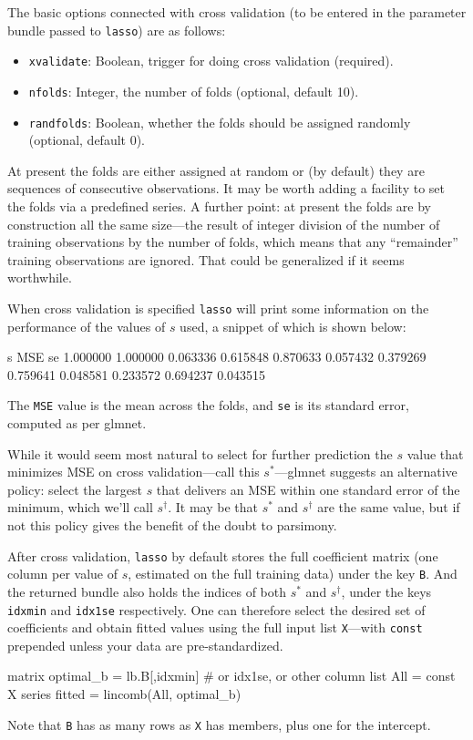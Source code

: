 \documentclass{article}
\begin{document}
The basic options connected with cross validation (to be entered in
the parameter bundle passed to \texttt{lasso}) are as follows:
\begin{itemize}
\item \texttt{xvalidate}: Boolean, trigger for doing cross validation (required).
\item \texttt{nfolds}: Integer, the number of folds (optional, default
  10).
\item \texttt{randfolds}: Boolean, whether the folds should be
  assigned randomly (optional, default 0).
\end{itemize}

At present the folds are either assigned at random or (by default)
they are sequences of consecutive observations. It may be worth adding
a facility to set the folds via a predefined series. A further point:
at present the folds are by construction all the same size---the
result of integer division of the number of training observations by
the number of folds, which means that any ``remainder'' training
observations are ignored. That could be generalized if it seems
worthwhile.

When cross validation is specified \texttt{lasso} will print some
information on the performance of the values of $s$ used, a
snippet of which is shown below:
\begin{code}
          s        MSE         se
   1.000000   1.000000   0.063336
   0.615848   0.870633   0.057432
   0.379269   0.759641   0.048581
   0.233572   0.694237   0.043515
\end{code}
The \texttt{MSE} value is the mean across the folds, and \texttt{se}
is its standard error, computed as per \textsf{glmnet}.

While it would seem most natural to select for further prediction the
$s$ value that minimizes MSE on cross validation---call this
$s^*$---\textsf{glmnet} suggests an alternative policy: select the
largest $s$ that delivers an MSE within one standard error of the
minimum, which we'll call $s^{\dagger}$. It may be that $s^*$ and
$s^{\dagger}$ are the same value, but if not this policy gives the
benefit of the doubt to parsimony.

After cross validation, \texttt{lasso} by default stores the full
coefficient matrix (one column per value of $s$, estimated on the full
training data) under the key \texttt{B}.  And the returned bundle also
holds the indices of both $s^*$ and $s^{\dagger}$, under the keys
\texttt{idxmin} and \texttt{idx1se} respectively. One can therefore
select the desired set of coefficients and obtain fitted values using
the full input list \texttt{X}---with \texttt{const} prepended unless
your data are pre-standardized.
\begin{code}
matrix optimal_b = lb.B[,idxmin] # or idx1se, or other column
list All = const X
series fitted = lincomb(All, optimal_b)
\end{code}
Note that \texttt{B} has as many rows as \texttt{X} has members, plus
one for the intercept.
\end{document}
